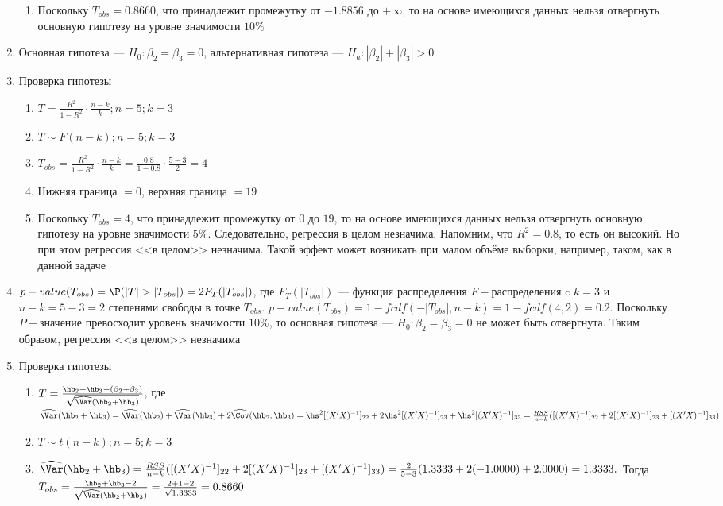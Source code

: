 \documentclass[pdftex,11pt,openany]{book}\usepackage[]{graphicx}\usepackage[]{color}
\begin{document}
\begin{solution}
\begin{enumerate}
\begin{enumerate}
\item Поскольку $T_{obs} = 0.8660$, что принадлежит промежутку от $-1.8856$ до $+\infty$, то на основе имеющихся данных нельзя отвергнуть основную гипотезу на уровне значимости $10\%$
\end{enumerate}
\item Основная гипотеза --- $H_0: \beta_2 = \beta_3 = 0$, альтернативная гипотеза --- $H_a: |\beta_2| + |\beta_3| > 0$
\item Проверка гипотезы
\begin{enumerate}
\item $T = \frac{R^2}{1 - R^2} \cdot \frac{n-k}{k}; n = 5; k = 3$
\item $T \sim F(n-k); n = 5; k = 3$
\item $T_{obs} = \frac{R^2}{1 - R^2} \cdot \frac{n-k}{k} = \frac{0.8}{1 - 0.8} \cdot \frac{5-3}{2} = 4$
\item Нижняя граница $= 0$, верхняя граница $= 19$
\item Поскольку $T_{obs} = 4$, что принадлежит промежутку от $0$ до $19$, то на основе имеющихся данных нельзя отвергнуть основную гипотезу на уровне значимости $5\%$. Следовательно, регрессия в целом незначима. Напомним, что $R^2 = 0.8$, то есть он высокий. Но при этом регрессия <<в целом>> незначима. Такой эффект может возникать при малом объёме выборки, например, таком, как в данной задаче
\end{enumerate}
\item $p-value(T_{obs}) = \P (|T|>|T_{obs}|) = 2F_{T}(|T_{obs}|)$, где $F_{T}(|T_{obs}|)$ --- функция распределения $F-$распределения c $k = 3$ и $n - k = 5 - 3 = 2$ степенями свободы в точке $T_{obs}$. $p-value(T_{obs}) = 1 - fcdf(-|T_{obs}|, n - k) = 1 - fcdf(4,2) = 0.2$. Поскольку $P-$значение превосходит уровень значимости $10\%$, то основная гипотеза --- $H_0: \beta_2 = \beta_3 = 0$ не может быть отвергнута. Таким образом, регрессия <<в целом>> незначима
\item Проверка гипотезы
\begin{enumerate}
\item $T = \frac{\hb_2 + \hb_3 - (\beta_2 + \beta_3)}{\sqrt{\widehat{\Var}(\hb_2 + \hb_3)}}$, где $\widehat{\Var}(\hb_2 + \hb_3) = \widehat{\Var}(\hb_2) + \widehat{\Var}(\hb_3) + 2\widehat{\Cov}(\hb_2;\hb_3) = \hs^2 [(X'X)^{-1}]_{22} + 2\hs^2 [(X'X)^{-1}]_{23} + \hs^2 [(X'X)^{-1}]_{33}= \frac{RSS}{n - k}([(X'X)^{-1}]_{22} + 2[(X'X)^{-1}]_{23} + [(X'X)^{-1}]_{33})$
\item $T \sim t(n-k); n = 5; k = 3$
\item $\widehat{\Var}(\hb_2 + \hb_3) = \frac{RSS}{n - k}([(X'X)^{-1}]_{22} + 2[(X'X)^{-1}]_{23} + [(X'X)^{-1}]_{33}) = \frac{2}{5 - 3} (1.3333 + 2(-1.0000) + 2.0000) = 1.3333.$ Тогда $T_{obs} = \frac{\hb_2 + \hb_3 - 2}{\sqrt{\widehat{\Var}(\hb_2 + \hb_3)}} = \frac{2 + 1 - 2}{\sqrt{1.3333}} = 0.8660$

\end{enumerate}
\end{enumerate}
\end{solution}
\end{document}
